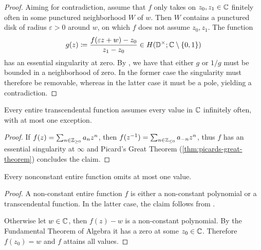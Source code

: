 \begin{proof}
    Aiming for contradiction, assume that $f$ only takes on $z_0, z_1 \in \mathbb{C}$ finitely often in some punctured neighborhood $W$ of $w$. Then $W$ contains a punctured disk of radius $\varepsilon > 0$ around $w$, on which $f$ does not assume $z_0, z_1$. The function
    $$ g(z) \coloneqq \frac{f(\varepsilon z + w) - z_0}{z_1 - z_0} \in H(\mathbb{D}^\times; \mathbb{C} \setminus \{ 0, 1 \}) $$
    has an essential singularity at zero. By , we have that either $g$ or $1/g$ must be bounded in a neighborhood of zero. In the former case the singularity must therefore be removable, whereas in the latter case it must be a pole, yielding a contradiction.
\end{proof}

\begin{corollary} \label{cor:transcendental-every-value-inf}
    Every entire transcendental function assumes every value in $\mathbb{C}$ infinitely often, with at most one exception.
\end{corollary}

\begin{proof}
    If $f(z) = \sum_{n \in \mathbb{Z}_{\geq 0}} a_n z^n$, then $f(z^{-1}) = \sum_{n \in \mathbb{Z}_{\leq 0}} a_{-n} z^{n}$, thus $f$ has an essential singularity at $\infty$ and Picard's Great Theorem (\ref{thm:picards-great-theorem}) concludes the claim.
\end{proof}

\begin{corollary} \label{thm:picards-little-theorem}
    Every nonconstant entire function omits at most one value.
\end{corollary}

\begin{proof}
    A non-constant entire function $f$ is either a non-constant polynomial or a transcendental function. In the latter case, the claim follows from .
    
    Otherwise let $w \in \mathbb{C}$, then $f(z) - w$ is a non-constant polynomial. By the Fundamental Theorem of Algebra it has a zero at some $z_0 \in \mathbb{C}$. Therefore $f(z_0) = w$ and $f$ attains all values.
\end{proof}